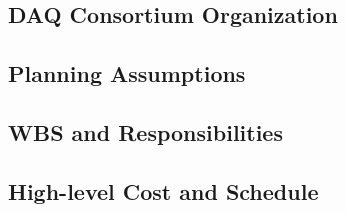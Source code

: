 \subsection{DAQ Consortium Organization}
\label{sec:fdsp-daq-org-consortium}


\subsection{Planning Assumptions}
\label{sec:fdsp-daq-org-assmp}


\subsection{WBS and Responsibilities}
\label{sec:fdsp-daq-org-wbs}

\subsection{High-level Cost and Schedule}
\label{sec:fdsp-daq-org-cs}














